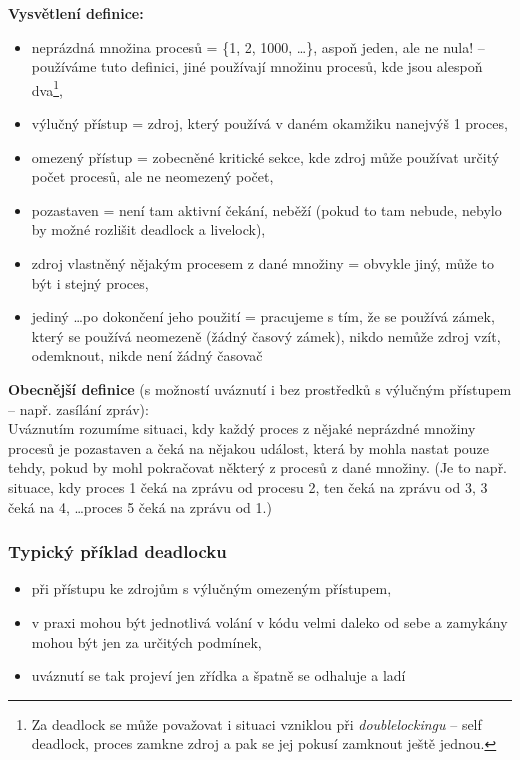 \documentclass[a4paper, 11pt]{article}
\begin{document}
\textbf{Vysvětlení definice:}
\begin{itemize}
    \item neprázdná množina procesů = \{1, 2, 1000, \ldots\}, aspoň jeden, ale ne nula! -- používáme tuto definici, jiné používají množinu procesů, kde jsou alespoň dva\footnote{Za deadlock se může považovat i situaci vzniklou při \emph{doublelockingu} -- self deadlock, proces zamkne zdroj a pak se jej pokusí zamknout ještě jednou.},
    \item výlučný přístup = zdroj, který používá v daném okamžiku nanejvýš 1 proces,
    \item omezený přístup = zobecněné kritické sekce, kde zdroj může používat určitý počet procesů, ale ne neomezený počet,
    \item pozastaven = není tam aktivní čekání, neběží (pokud to tam nebude, nebylo by možné rozlišit deadlock a livelock),
    \item zdroj vlastněný nějakým procesem z dané množiny = obvykle jiný, může to být i stejný proces,
    \item jediný \ldots po dokončení jeho použití = pracujeme s tím, že se používá zámek, který se používá neomezeně (žádný časový zámek), nikdo nemůže zdroj vzít, odemknout, nikde není žádný časovač
\end{itemize}

\textbf{Obecnější definice} (s možností uváznutí i bez prostředků s výlučným přístupem -- např. zasílání zpráv): \\
Uváznutím rozumíme situaci, kdy každý proces z nějaké neprázdné množiny procesů je pozastaven a čeká na nějakou událost, která by mohla nastat pouze tehdy, pokud by mohl pokračovat některý z procesů z dané množiny. (Je to např. situace, kdy proces 1 čeká na zprávu od procesu 2, ten čeká na zprávu od 3, 3 čeká na 4, \ldots proces 5 čeká na zprávu od 1.)

\subsubsection{Typický příklad deadlocku}
\begin{itemize}
    \item při přístupu ke zdrojům s výlučným omezeným přístupem,
    \item v praxi mohou být jednotlivá volání v kódu velmi daleko od sebe a zamykány mohou být jen za určitých podmínek,
    \item uváznutí se tak projeví jen zřídka a špatně se odhaluje a ladí
\end{itemize}
\end{document}
